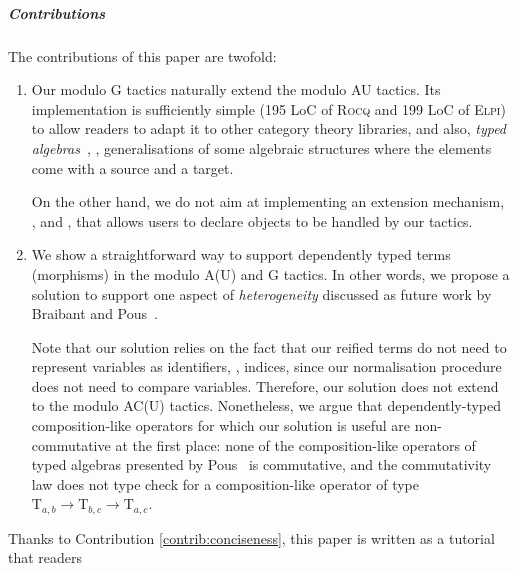 \documentclass[a4paper,UKenglish,cleveref,autoref]{lipics-v2021}
\newcommand{\Rocq}{{\sffamily\scshape Rocq}\xspace}
\newcommand{\Elpi}{{\sffamily\scshape Elpi}\xspace}
\begin{document}
\subparagraph{Contributions}
The contributions of this paper are twofold:
\begin{enumerate}
\item\label{contrib:conciseness}
  Our modulo G tactics naturally extend the modulo AU tactics. Its implementation is sufficiently
  simple (195 LoC of \Rocq and 199 LoC of \Elpi) to allow readers to adapt it to other category
  theory libraries, and also, \emph{typed algebras}~\cite{DBLP:journals/corr/abs-1205-3612}, \ie,
  generalisations of some algebraic structures where the elements come with a source and a target.

  On the other hand, we do not aim at implementing an extension mechanism, \eg,
  \cite[Section 2]{DBLP:conf/cpp/BraibantP11} and \cite[Section 6.2]{DBLP:conf/tphol/GregoireM05},
  that allows users to declare objects to be handled by our tactics.
\item\label{contrib:heterogeneity}
  We show a straightforward way to support dependently typed terms (morphisms) in the modulo
  A(U) and G tactics. In other words, we propose a solution to support one aspect of
  \emph{heterogeneity} discussed as future work by Braibant and Pous~\cite[Section
    6.2]{DBLP:conf/cpp/BraibantP11}.

  Note that our solution relies on the fact that our reified terms do not need to represent
  variables as identifiers, \eg, indices, since our normalisation procedure does not need to compare
  variables. Therefore, our solution does not extend to the modulo AC(U) tactics.
  Nonetheless, we argue that dependently-typed composition-like operators for which our solution is
  useful are non-commutative at the first place: none of the composition-like operators of typed
  algebras presented by Pous~\cite{DBLP:journals/corr/abs-1205-3612} is commutative, and the
  commutativity law does not type check for a composition-like operator of type
  $\mathrm{T}_{a, b} \to \mathrm{T}_{b, c} \to \mathrm{T}_{a, c}$.
\end{enumerate}
Thanks to Contribution \ref{contrib:conciseness}, this paper is written as a tutorial that readers
\end{document}
